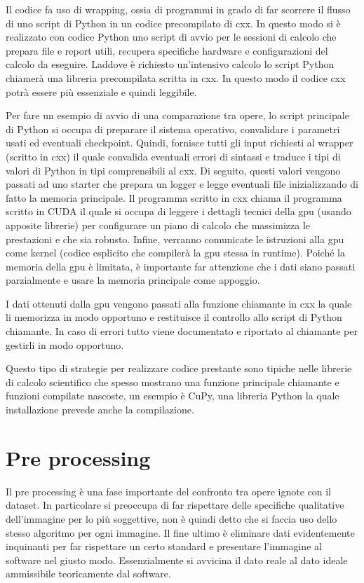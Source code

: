 \begin{toDo}
	\bigskip\noindent Il codice fa uso di wrapping, ossia di programmi in grado di far scorrere il flusso di uno script di \gls{Python} in un codice precompilato di \gls{cxx}. In questo modo si è realizzato con codice \gls{Python} uno script di avvio per le sessioni di calcolo che prepara file e report utili, recupera specifiche hardware e configurazioni del calcolo da eseguire. Laddove è richiesto un'intensivo calcolo lo script \gls{Python} chiamerà una libreria precompilata scritta in \gls{cxx}. In questo modo il codice \gls{cxx} potrà essere più essenziale e quindi leggibile.

	\noindent Per fare un esempio di avvio di una comparazione tra opere, lo script principale di \gls{Python} si occupa di preparare il sistema operativo, convalidare i parametri usati ed eventuali checkpoint. Quindi, fornisce tutti gli input richiesti al wrapper (scritto in \gls{cxx}) il quale convalida eventuali errori di sintassi e traduce i tipi di valori di \gls{Python} in tipi comprensibili al \gls{cxx}. Di seguito, questi valori vengono passati ad uno starter che prepara un logger e legge eventuali file inizializzando di fatto la memoria principale. Il programma scritto in \gls{cxx} chiama il programma scritto in \gls{CUDA} il quale si occupa di leggere i dettagli tecnici della \gls{gpu} (usando apposite librerie) per configurare un piano di calcolo che massimizza le prestazioni e che sia robusto. Infine, verranno comunicate le istruzioni alla \gls{gpu} come kernel (codice esplicito che compilerà la \gls{gpu} stessa in runtime). Poiché la memoria della \gls{gpu} è limitata, è importante far attenzione che i dati siano passati parzialmente e usare la memoria principale come appoggio.

	\noindent I dati ottenuti dalla \gls{gpu} vengono passati alla funzione chiamante in \gls{cxx} la quale li memorizza in modo opportuno e restituisce il controllo allo script di \gls{Python} chiamante. In caso di errori tutto viene documentato e riportato al chiamante per gestirli in modo opportuno.

	\noindent Questo tipo di strategie per realizzare codice prestante sono tipiche nelle librerie di calcolo scientifico che spesso mostrano una funzione principale chiamante e funzioni compilate nascoste, un esempio è CuPy, una libreria \gls{Python} la quale installazione prevede anche la compilazione.

    \section{Pre processing}
    Il pre processing è una fase importante del confronto tra opere ignote con il dataset. In particolare si preoccupa di far rispettare delle specifiche qualitative dell'immagine per lo più soggettive, non è quindi detto che si faccia uso dello stesso algoritmo per ogni immagine. Il fine ultimo è eliminare dati evidentemente inquinanti per far rispettare un certo standard e presentare l'immagine al software nel giusto modo. Essenzialmente si avvicina il dato reale al dato ideale ammissibile teoricamente dal software.


\end{toDo}
